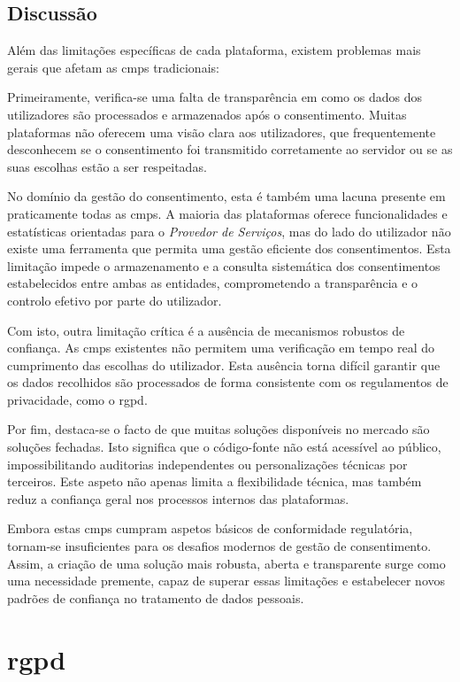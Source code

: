 \subsection{Discussão}

Além das limitações específicas de cada plataforma, existem problemas mais gerais que afetam as \acrshort{cmp}s tradicionais:

Primeiramente, verifica-se uma falta de transparência em como os dados dos utilizadores são processados e armazenados após o consentimento. Muitas plataformas não oferecem uma visão clara aos utilizadores, que frequentemente desconhecem se o consentimento foi transmitido corretamente ao servidor ou se as suas escolhas estão a ser respeitadas.

No domínio da gestão do consentimento, esta é também uma lacuna presente em praticamente todas as \acrshort{cmp}s. A maioria das plataformas oferece funcionalidades e estatísticas orientadas para o \textit{Provedor de Serviços}, mas do lado do utilizador não existe uma ferramenta que permita uma gestão eficiente dos consentimentos. Esta limitação impede o armazenamento e a consulta sistemática dos consentimentos estabelecidos entre ambas as entidades, comprometendo a transparência e o controlo efetivo por parte do utilizador.

Com isto, outra limitação crítica é a ausência de mecanismos robustos de confiança. As \acrshort{cmp}s existentes não permitem uma verificação em tempo real do cumprimento das escolhas do utilizador. Esta ausência torna difícil garantir que os dados recolhidos são processados de forma consistente com os regulamentos de privacidade, como o \acrshort{rgpd}.

Por fim, destaca-se o facto de que muitas soluções disponíveis no mercado são soluções fechadas. Isto significa que o código-fonte não está acessível ao público, impossibilitando auditorias independentes ou personalizações técnicas por terceiros. Este aspeto não apenas limita a flexibilidade técnica, mas também reduz a confiança geral nos processos internos das plataformas.

Embora estas \acrshort{cmp}s cumpram aspetos básicos de conformidade regulatória, tornam-se insuficientes para os desafios modernos de gestão de consentimento. Assim, a criação de uma solução mais robusta, aberta e transparente surge como uma necessidade premente, capaz de superar essas limitações e estabelecer novos padrões de confiança no tratamento de dados pessoais.


\section{\acrfull{rgpd}}

